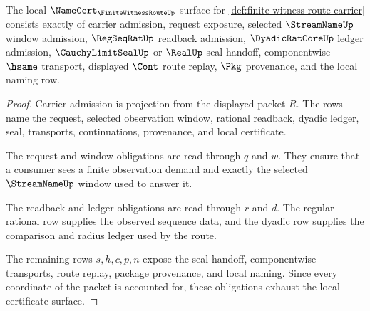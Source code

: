 \begin{theorem}
\label{thm:finite-witness-route-namecert-obligations}
The local $\NameCert_{\FiniteWitnessRouteUp}$ surface for \autoref{def:finite-witness-route-carrier} consists exactly of carrier admission, request exposure, selected $\StreamNameUp$ window admission, $\RegSeqRatUp$ readback admission, $\DyadicRatCoreUp$ ledger admission, $\CauchyLimitSealUp$ or $\RealUp$ seal handoff, componentwise $\hsame$ transport, displayed $\Cont$ route replay, $\Pkg$ provenance, and the local naming row.
\end{theorem}
\begin{proof}
Carrier admission is projection from the displayed packet $R$. The rows name the request, selected observation window, rational readback, dyadic ledger, seal, transports, continuations, provenance, and local certificate.

The request and window obligations are read through $q$ and $w$. They ensure that a consumer sees a finite observation demand and exactly the selected $\StreamNameUp$ window used to answer it.

The readback and ledger obligations are read through $r$ and $d$. The regular rational row supplies the observed sequence data, and the dyadic row supplies the comparison and radius ledger used by the route.

The remaining rows $s,h,c,p,n$ expose the seal handoff, componentwise transports, route replay, package provenance, and local naming. Since every coordinate of the packet is accounted for, these obligations exhaust the local certificate surface.
\end{proof}

